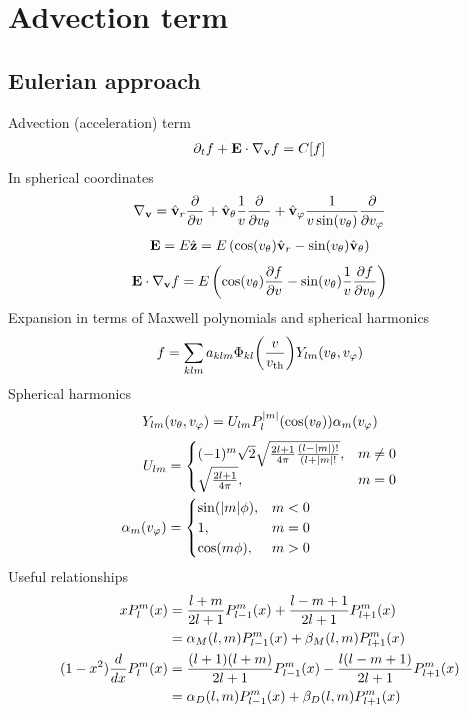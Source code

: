 \documentclass{article}[draft]
\begin{document}
\clearpage
\section{Advection term}
\subsection{Eulerian approach}
Advection (acceleration) term
\begin{align*}
\partial_t f + \mathbf{E}\cdot \nabla_{\mathbf{v}} f = C[f]
\end{align*}
In spherical coordinates
\begin{align*}
\nabla_{\vect{v}} 
= \vrunit \frac{\partial}{\partial \vr}
+ \vthetaunit \frac{1}{\vr} \frac{\partial}{\partial \vtheta}
+ \vphiunit \frac{1}{\vr \sin\of{\vtheta}} \frac{\partial}{\partial \vphi}
\end{align*}
\begin{align*}
\vect{E} 
= E \hat{\vect{z}} 
= E \left( \cos\of{\vtheta} \vrunit - \sin\of{\vtheta} \vthetaunit \right)
\end{align*}
\begin{align*}
\vect{E}\cdot \nabla_{\vect{v}} f
= E 
\left( \cos\of{\vtheta} \frac{\partial f}{\partial \vr} 
- \sin\of{\vtheta} \frac{1}{\vr} \frac{\partial f}{\partial \vtheta} \right)
\end{align*}
Expansion in terms of Maxwell polynomials and spherical harmonics
\begin{align*}
f = 
\sum_{klm} a_{klm} \Phi_{kl}\of{\frac{v}{\vth}} Y_{lm}\of{\vtheta,\vphi}
\end{align*}
Spherical harmonics
\begin{align*}
Y_{lm}\of{\vtheta,\vphi} = U_{lm} P^{|m|}_l\of{\cos\of{\vtheta}} \alpha_m\of{\vphi}
\end{align*}
\begin{align*}
U_{lm} &= 
\begin{cases}
(-1)^m \sqrt{2} \sqrt{\frac{2l+1}{4\pi} \frac{(l-|m|)!}{(l+|m|!}}, &m\neq 0 \\
\sqrt{\frac{2l+1}{4\pi}}, &m = 0
\end{cases}
\\
\alpha_m\of{\vphi}
&=
\begin{cases}
\sin\of{|m|\phi}, &m < 0 \\
1, &m = 0\\
\cos\of{m\phi}, &m > 0
\end{cases}
\end{align*}
Useful relationships
\begin{align*}
x P^m_l\of{x} 
&= \frac{l+m}{2l+1} P^m_{l-1}\of{x}
+ \frac{l-m+1}{2l+1} P^m_{l+1}\of{x}
\\
&= \alpha_M\of{l,m} P^m_{l-1}\of{x}
+ \beta_M\of{l,m} P^m_{l+1}\of{x}
\\
(1-x^2) \frac{d}{dx} P^m_l\of{x} 
&= \frac{(l+1)(l+m)}{2l+1} P^m_{l-1}\of{x} 
- \frac{l(l-m+1)}{2l+1} P^m_{l+1}\of{x}
\\
&= \alpha_D\of{l,m} P^m_{l-1}\of{x} 
+ \beta_D\of{l,m} P^m_{l+1}\of{x}
\end{align*}
\end{document}
